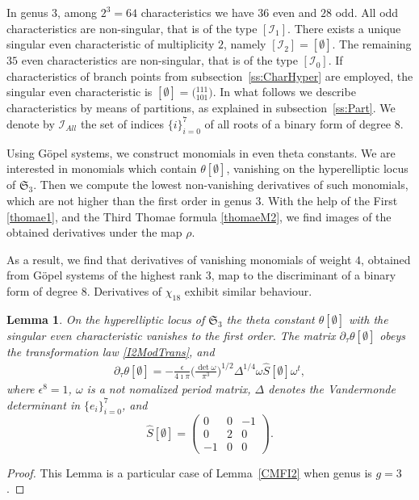 \documentclass[twoside]{amsart}
\newcommand{\I}{\mathcal{I}}
\newtheorem{lemma}{Lemma}[section]
\theoremstyle{definition}
\theoremstyle{plain}
\begin{document}
In genus $3$, among $2^3=64$ characteristics we have $36$ even and $28$ odd.
All odd characteristics are non-singular, that is of the type $[\I_1]$. 
There exists a unique singular even characteristic of multiplicity $2$, namely $[\I_2]=[\emptyset]$. 
The remaining $35$ even characteristics are non-singular, that is of the type $[\I_0]$.
If characteristics of branch points from subsection~\ref{ss:CharHyper} are employed,
the singular even characteristic is $[\emptyset] = \big({}^{111}_{101}\big)$.
In what follows we describe characteristics by means of partitions, as explained in subsection~\ref{ss:Part}.
We denote by $\I_{All}$ the set of indices $\{i\}_{i=0}^7$ of all roots of a binary form of degree $8$.

Using G\"{o}pel systems, we construct monomials in even theta constants.
We are interested in monomials which contain $\theta[\emptyset]$, vanishing 
on the hyperelliptic locus of $\mathfrak{S}_3$. Then we compute the lowest non-vanishing derivatives
of such monomials, which are not higher than the first order in genus $3$.
With the help of the First \eqref{thomae1}, and the Third Thomae formula \eqref{thomaeM2}, 
we find images of the obtained derivatives under the map $\rho$. 

As a result, we find that derivatives of vanishing monomials of weight $4$, obtained from G\"{o}pel systems 
of the highest rank $3$, map to the discriminant of a binary form of degree $8$.
Derivatives of $\chi_{18}$ exhibit similar behaviour.


\begin{lemma}\label{CMFI2G3}
On the hyperelliptic locus of $\mathfrak{S}_3$ 
the theta constant $\theta[\emptyset]$ with the singular even characteristic vanishes 
to the first order. The matrix  
$\partial_\tau \theta[\emptyset]$  obeys the transformation law \eqref{I2ModTrans}, and
\begin{gather}\label{Chi5s2}
\partial_\tau \theta[\emptyset] 
 = - \frac{\epsilon}{4\imath \pi}\Big(\frac{\det \omega}{\pi^3}\Big)^{1/2}\Delta^{1/4}
 \omega \hat{S}[\emptyset] \omega^t,
\end{gather}
where $\epsilon^8=1$, $\omega$ is a not nomalized period matrix, $\Delta$ denotes 
the Vandermonde determinant in $\{e_i\}_{i=0}^7$, and
$$\hat{S}[\emptyset] =  \begin{pmatrix} 0&0&-1 \\ 0&2&0 \\ -1&0&0 \end{pmatrix}. $$
\end{lemma}
\begin{proof}
This Lemma is a particular case of Lemma~\ref{CMFI2} when genus is $g=3$.
\end{proof}
\end{document}
